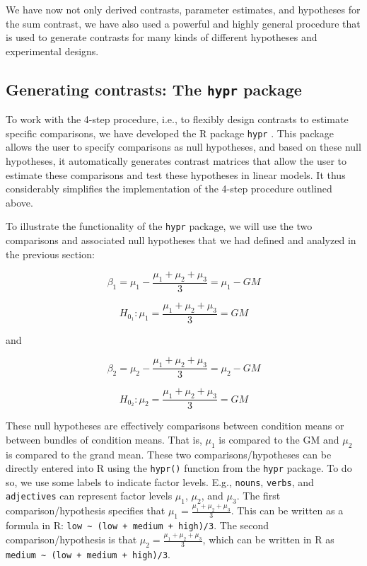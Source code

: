 \documentclass[12pt,]{krantz}
\begin{document}
We have now not only derived contrasts, parameter estimates, and hypotheses for the sum contrast, we have also used a powerful and highly general procedure that is used to generate contrasts for many kinds of different hypotheses and experimental designs.

\hypertarget{generating-contrasts-the-hypr-package}{%
\subsection{\texorpdfstring{Generating contrasts: The \texttt{hypr} package}{Generating contrasts: The hypr package}}\label{generating-contrasts-the-hypr-package}}

To work with the 4-step procedure, i.e., to flexibly design contrasts to estimate specific comparisons, we have developed the R package \texttt{hypr} \citep{rabe2020hypr}. This package allows the user to specify comparisons as null hypotheses, and based on these null hypotheses, it automatically generates contrast matrices that allow the user to estimate these comparisons and test these hypotheses in linear models. It thus considerably simplifies the implementation of the 4-step procedure outlined above.

To illustrate the functionality of the \texttt{hypr} package, we will use the two comparisons and associated null hypotheses that we had defined and analyzed in the previous section:

\begin{equation}
\beta_1 = \mu_1 - \frac{\mu_1+\mu_2+\mu_3}{3} = \mu_1 - GM
\end{equation}

\begin{equation}
H_{0_1}: \mu_1 = \frac{\mu_1+\mu_2+\mu_3}{3} = GM
\end{equation}

\noindent
and

\begin{equation}
\beta_2 = \mu_2 - \frac{\mu_1+\mu_2+\mu_3}{3} = \mu_2 - GM
\end{equation}

\begin{equation}
H_{0_2}: \mu_2 = \frac{\mu_1+\mu_2+\mu_3}{3} = GM
\end{equation}

These null hypotheses are effectively comparisons between condition means or between bundles of condition means. That is, \(\mu_1\) is compared to the GM and \(\mu_2\) is compared to the grand mean. These two comparisons/hypotheses can be directly entered into R using the \texttt{hypr()} function from the \texttt{hypr} package.
To do so, we use some labels to indicate factor levels. E.g., \texttt{nouns}, \texttt{verbs}, and \texttt{adjectives} can represent factor levels \(\mu_1\), \(\mu_2\), and \(\mu_3\). The first comparison/hypothesis specifies that \(\mu_1 = \frac{\mu_1+\mu_2+\mu_3}{3}\). This can be written as a formula in R: \texttt{low\ \textasciitilde{}\ (low\ +\ medium\ +\ high)/3}. The second comparison/hypothesis is that \(\mu_2 = \frac{\mu_1+\mu_2+\mu_3}{3}\), which can be written in R as \texttt{medium\ \textasciitilde{}\ (low\ +\ medium\ +\ high)/3}.
\end{document}
